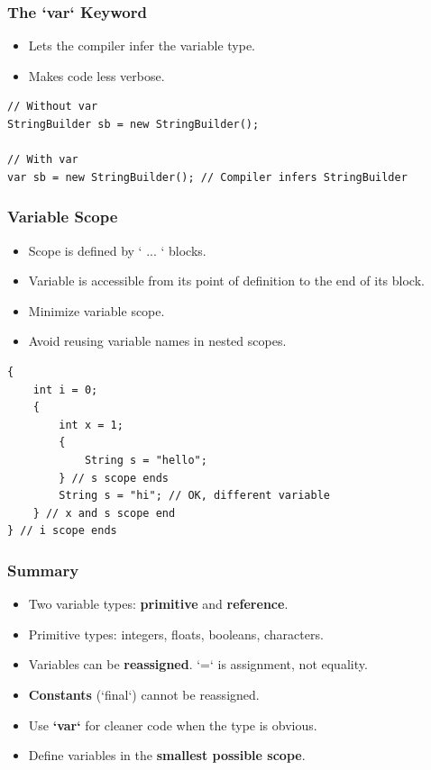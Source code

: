 \documentclass[serif, aspectratio=169]{beamer}
\begin{document}
\begin{frame}[fragile]
\frametitle{The `var` Keyword}
\begin{itemize}
    \item Lets the compiler infer the variable type.
    \item Makes code less verbose.
\end{itemize}
\begin{lstlisting}
// Without var
StringBuilder sb = new StringBuilder();

// With var
var sb = new StringBuilder(); // Compiler infers StringBuilder
\end{lstlisting}
\end{frame}

\begin{frame}[fragile]
\frametitle{Variable Scope}
\begin{itemize}
    \item Scope is defined by `{ ... }` blocks.
    \item Variable is accessible from its point of definition to the end of its block.
    \item Minimize variable scope.
    \item Avoid reusing variable names in nested scopes.
\end{itemize}
\begin{lstlisting}
{
    int i = 0;
    {
        int x = 1;
        {
            String s = "hello";
        } // s scope ends
        String s = "hi"; // OK, different variable
    } // x and s scope end
} // i scope ends
\end{lstlisting}
\end{frame}

\begin{frame}[fragile]
\frametitle{Summary}
\begin{itemize}
    \item Two variable types: \textbf{primitive} and \textbf{reference}.
    \item Primitive types: integers, floats, booleans, characters.
    \item Variables can be \textbf{reassigned}. `=` is assignment, not equality.
    \item \textbf{Constants} (`final`) cannot be reassigned.
    \item Use \textbf{`var`} for cleaner code when the type is obvious.
    \item Define variables in the \textbf{smallest possible scope}.
\end{itemize}
\end{frame}
\end{document}
